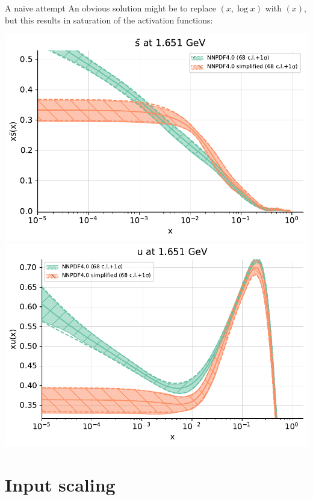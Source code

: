 \documentclass[aspectratio=169,11pt]{beamer}
\newcommand{\nn}{\vspace*{1em}}
\begin{document}
\begin{frame}[t]{A naive attempt}
  An obvious solution might be to replace $(x,\log x)$ with $(x)$, but this results in saturation of the activation functions:
  \begin{center}
    \includegraphics[height=0.6\textheight]{pdf_sbar_log_saturated.pdf} 
    \includegraphics[height=0.6\textheight]{pdf_u_log_saturated.pdf}
  \end{center}
\end{frame}


\section{Input scaling}
\end{document}
